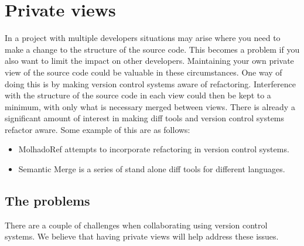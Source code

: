 
\chapter{Private views}

In a project with multiple developers situations may arise where you need to make a change to the structure of the source code. 
This becomes a problem if you also want to limit the impact on other developers.  
Maintaining your own private view of the source code could be valuable in these circumstances. 
One way of doing this is by making version control systems aware of refactoring. 
Interference with the structure of the source code in each view could then be kept to a minimum, with only what is necessary merged between views.
There is already a significant amount of interest in making diff tools and version control systems refactor aware. 
Some example of this are as follows:

\begin{itemize}
  \item MolhadoRef \cite{DannyDig} \cite{Dig2008} attempts to incorporate refactoring in version control systems.
  \item Semantic Merge is a series of stand alone diff tools for different languages. 
\end{itemize}

\section{The problems}
There are a couple of challenges when collaborating using version control systems. We believe that having private views will help address these issues.  


